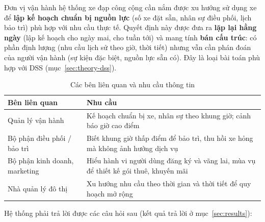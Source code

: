 \newpage
{}\label{sec:requirements}

Đơn vị vận hành hệ thống xe đạp công cộng cần nắm được xu hướng sử dụng xe để \textbf{lập kế hoạch chuẩn bị nguồn lực} (số xe đặt sẵn, nhân sự điều phối, lịch bảo trì) phù hợp với nhu cầu thực tế. Quyết định này được đưa ra \textbf{lặp lại hằng ngày} (lập kế hoạch cho ngày mai, cho tuần tới) và mang tính \textbf{bán cấu trúc}: có phần định lượng (nhu cầu lịch sử theo giờ, thời tiết) nhưng vẫn cần phán đoán của người vận hành (sự kiện đặc biệt, nguồn lực sẵn có). Đây là loại bài toán phù hợp với DSS (mục~\ref{sec:theory-dss}).

\begin{table}[H]
\centering
\caption{Các bên liên quan và nhu cầu thông tin}
\begin{tabularx}{\textwidth}{|p{3.8cm}|X|}
\hline
\textbf{Bên liên quan} & \textbf{Nhu cầu} \\ \hline
Quản lý vận hành & Kế hoạch chuẩn bị xe, nhân sự theo khung giờ; cảnh báo giờ cao điểm \\ \hline
Bộ phận điều phối / bảo trì & Biết khung giờ thấp điểm để bảo trì, thu hồi xe hỏng mà không ảnh hưởng dịch vụ \\ \hline
Bộ phận kinh doanh, marketing & Hiểu hành vi người dùng đăng ký và vãng lai, mùa vụ để thiết kế gói thuê, khuyến mãi \\ \hline
Nhà quản lý đô thị & Xu hướng nhu cầu theo thời gian và thời tiết để quy hoạch mở rộng \\ \hline
\end{tabularx}
\end{table}

\label{sec:questions}
Hệ thống phải trả lời được các câu hỏi sau (kết quả trả lời ở mục~\ref{sec:results}):

